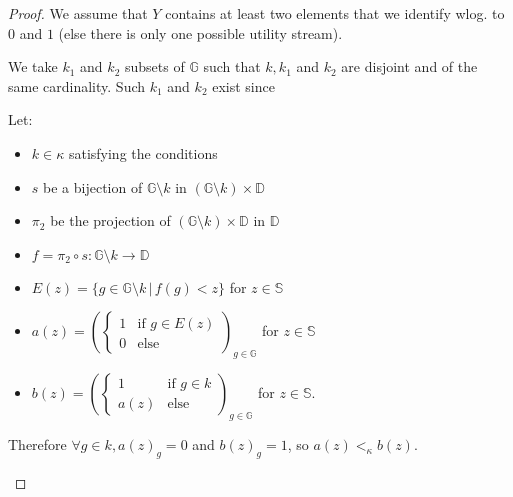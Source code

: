 \documentclass{article}
\newcommand{\G}{\mathbb{G}}
\newcommand{\D}{\mathbb{D}}
\begin{document}
\begin{proof}
  We assume that $Y$ contains at least two elements that we identify wlog. to $0$
  and $1$ (else there is only one possible utility stream).\par
  We take $k_1$ and $k_2$ subsets of $\G$ such that $k, k_1$ and $k_2$ are disjoint and
  of the same cardinality. Such $k_1$ and $k_2$ exist since 

  Let:
  \begin{itemize}
  \item $k\in\kappa$ satisfying the conditions
  \item $s$ be a bijection of $\G\setminus k$ in $(\G\setminus k)\times\D$
  \item $\pi_2$ be the projection of $(\G\setminus k)\times \D$
        in $\mathbb D$
  \item $f=\pi_2\circ s:\G\setminus k\to\D$
  \item $E(z)=\{g\in \G\setminus k\,|\, f(g)<z\}$ for $z\in\mathbb S$
  \item $\displaystyle a(z)=\left(\left\{\begin{array}{ll}1&\text{if }g\in
        E(z)\\0&\text{else}\end{array}\right.\right)_{g\in\G}$ for $z\in \mathbb S$
  \item $\displaystyle b(z)=\left(\left\{\begin{array}{ll}1&\text{if }g\in
        k\\a(z)&\text{else}\end{array}\right.\right)_{g\in\G}$ for $z\in \mathbb S$.
  \end{itemize}

  Therefore $\forall g\in k, a(z)_g=0$ and $b(z)_g=1$, so $a(z)<_\kappa b(z)$.

  \begin{center}
  \end{center}


\end{proof}
\end{document}
